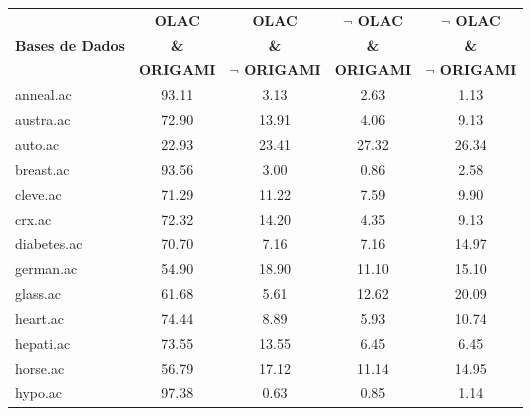 \begin{table}[htbp]
	\centering
		\renewcommand{\tabcolsep}{1.8mm}
		\begin{tabular}{|l|c|c|c|c|}
		\hline
				& \textbf{OLAC}		& \textbf{OLAC}			& \textbf{$\neg$ OLAC}	& \textbf{$\neg$ OLAC}	\\
		\textbf{Bases de Dados}	& \textbf{\&}		& \textbf{\&}			& \textbf{\&}			& \textbf{\&}			\\
				& \textbf{ORIGAMI}	& \textbf{$\neg$ ORIGAMI}	& \textbf{ORIGAMI}		& \textbf{$\neg$ ORIGAMI}	\\
		\hline
		anneal.ac       & 93.11         & 3.13               & 2.63                     & 1.13                          \\
		\hline
		austra.ac       & 72.90         & 13.91              & 4.06                     & 9.13                          \\
		\hline
		auto.ac         & 22.93         & 23.41              & 27.32                    & 26.34                         \\
		\hline
		breast.ac       & 93.56         & 3.00               & 0.86                     & 2.58                          \\
		\hline
		cleve.ac        & 71.29         & 11.22              & 7.59                     & 9.90                          \\
		\hline
		crx.ac          & 72.32         & 14.20              & 4.35                     & 9.13                          \\
		\hline
		diabetes.ac     & 70.70         & 7.16               & 7.16                     & 14.97                         \\
		\hline
		german.ac       & 54.90         & 18.90              & 11.10                    & 15.10                         \\
		\hline
		glass.ac        & 61.68         & 5.61               & 12.62                    & 20.09                         \\
		\hline
		heart.ac        & 74.44         & 8.89               & 5.93                     & 10.74                         \\
		\hline
		hepati.ac       & 73.55         & 13.55              & 6.45                     & 6.45                          \\
		\hline
		horse.ac        & 56.79         & 17.12              & 11.14                    & 14.95                         \\
		\hline
		hypo.ac         & 97.38         & 0.63               & 0.85                     & 1.14                          \\

\end{tabular}
\end{table}

